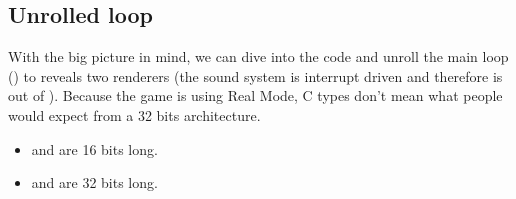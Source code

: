 \documentclass[book.tex]{subfiles}
\begin{document}
 









\subsection{Unrolled loop}
With the big picture in mind, we can dive into the code and unroll the main loop () to reveals two renderers (the sound system is interrupt driven and therefore is out of ). Because the game is using Real Mode, C types don't mean what people would expect from a 32 bits architecture.\\
\begin{itemize}
\item {} and  are 16 bits long.
\item {} and  are 32 bits long.
\end{itemize}

\par
\begin{minipage}{\textwidth}

\end{minipage}
\par
\end{document}
